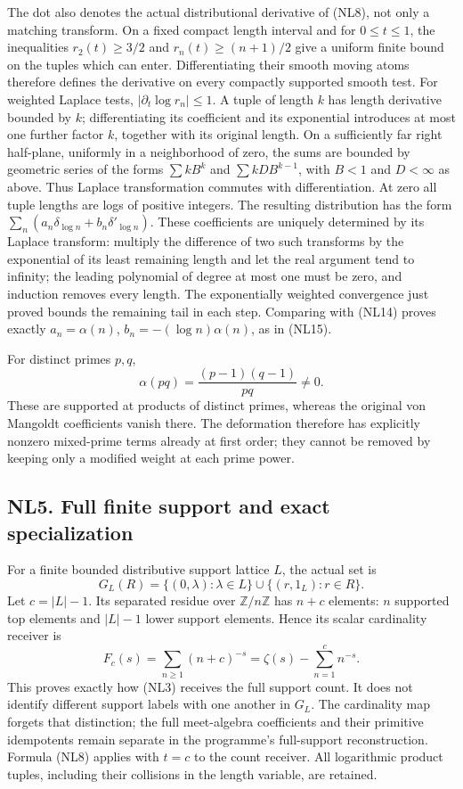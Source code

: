 \documentclass[
  10pt,
  a4paper,
]{article}
\begin{document}
The dot also denotes the actual distributional derivative of (NL8), not
only a matching transform. On a fixed compact length interval and for
\(0\le t\le1\), the inequalities \(r_2(t)\ge3/2\) and
\(r_n(t)\ge(n+1)/2\) give a uniform finite bound on the tuples which can
enter. Differentiating their smooth moving atoms therefore defines the
derivative on every compactly supported smooth test. For weighted
Laplace tests, \(|\partial_t\log r_n|\le1\). A tuple of length \(k\) has
length derivative bounded by \(k\); differentiating its coefficient and
its exponential introduces at most one further factor \(k\), together
with its original length. On a sufficiently far right half-plane,
uniformly in a neighborhood of zero, the sums are bounded by geometric
series of the forms \(\sum k B^k\) and \(\sum k D B^{k-1}\), with
\(B<1\) and \(D<\infty\) as above. Thus Laplace transformation commutes
with differentiation. At zero all tuple lengths are logs of positive
integers. The resulting distribution has the form
\(\sum_n(a_n\delta_{\log n}+b_n\delta'_{\log n})\). These coefficients
are uniquely determined by its Laplace transform: multiply the
difference of two such transforms by the exponential of its least
remaining length and let the real argument tend to infinity; the leading
polynomial of degree at most one must be zero, and induction removes
every length. The exponentially weighted convergence just proved bounds
the remaining tail in each step. Comparing with (NL14) proves exactly
\(a_n=\alpha(n)\), \(b_n=-(\log n)\alpha(n)\), as in (NL15).

For distinct primes \(p,q\), \[
\alpha(pq)=\frac{(p-1)(q-1)}{pq}\ne0.
\tag{NL16}
\] These are supported at products of distinct primes, whereas the
original von Mangoldt coefficients vanish there. The deformation
therefore has explicitly nonzero mixed-prime terms already at first
order; they cannot be removed by keeping only a modified weight at each
prime power.

\subsection{NL5. Full finite support and exact
specialization}\label{nl5.-full-finite-support-and-exact-specialization}

For a finite bounded distributive support lattice \(L\), the actual set
is \[
G_L(R)=\{(0,\lambda):\lambda\in L\}\cup\{(r,1_L):r\in R\}.
\tag{NL17}
\] Let \(c=|L|-1\). Its separated residue over \(\mathbb Z/n\mathbb Z\)
has \(n+c\) elements: \(n\) supported top elements and \(|L|-1\) lower
support elements. Hence its scalar cardinality receiver is \[
F_c(s)=\sum_{n\ge1}(n+c)^{-s}
=\zeta(s)-\sum_{n=1}^{c}n^{-s}.
\tag{NL18}
\] This proves exactly how (NL3) receives the full support count. It
does not identify different support labels with one another in \(G_L\).
The cardinality map forgets that distinction; the full meet-algebra
coefficients and their primitive idempotents remain separate in the
programme's full-support reconstruction. Formula (NL8) applies with
\(t=c\) to the count receiver. All logarithmic product tuples, including
their collisions in the length variable, are retained.
\end{document}
